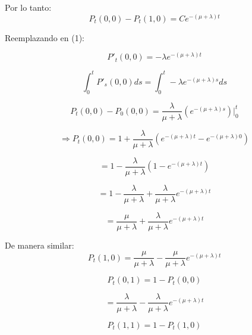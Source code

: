 \documentclass[12pt,a4paper]{article}
\begin{document}
Por lo tanto:
\begin{equation*}
P_t(0,0) - P_t(1,0) = Ce^{-(\mu+\lambda)t}
\end{equation*}

Reemplazando en (1):

\begin{equation*}
P'_t(0,0) = -\lambda e^{-(\mu+\lambda)t}
\end{equation*}

\begin{equation*}
\int_0^t P'_s(0,0) ds = \int_0^t -\lambda e^{-(\mu+\lambda)s} ds
\end{equation*}

\begin{equation*}
P_t(0,0) - P_0(0,0) = \frac{\lambda}{\mu+\lambda} \left(e^{-(\mu+\lambda)s}\right)\Bigg|_0^t
\end{equation*}

\begin{equation*}
\Rightarrow P_t(0,0) = 1 + \frac{\lambda}{\mu+\lambda} \left(e^{-(\mu+\lambda)t} - e^{-(\mu+\lambda)0}\right)
\end{equation*}

\begin{equation*}
= 1 - \frac{\lambda}{\mu+\lambda} \left(1 - e^{-(\mu+\lambda)t}\right)
\end{equation*}

\begin{equation*}
= 1 - \frac{\lambda}{\mu+\lambda} + \frac{\lambda}{\mu+\lambda} e^{-(\mu+\lambda)t}
\end{equation*}

\begin{equation*}
= \frac{\mu}{\mu+\lambda} + \frac{\lambda}{\mu+\lambda} e^{-(\mu+\lambda)t}
\end{equation*}

De manera similar:
\begin{equation*}
P_t(1,0) = \frac{\mu}{\mu+\lambda} - \frac{\mu}{\mu+\lambda} e^{-(\mu+\lambda)t}
\end{equation*}

\begin{equation*}
P_t(0,1) = 1 - P_t(0,0)
\end{equation*}

\begin{equation*}
= \frac{\lambda}{\mu+\lambda} - \frac{\lambda}{\mu+\lambda} e^{-(\mu+\lambda)t}
\end{equation*}

\begin{equation*}
P_t(1,1) = 1 - P_t(1,0)
\end{equation*}
\end{document}
